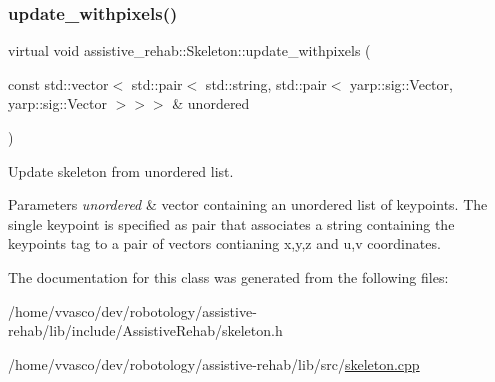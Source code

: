 \subsubsection{\texorpdfstring{update\+\_\+withpixels()}{update\_withpixels()}\hspace{0.1cm}{\footnotesize\ttfamily [2/2]}}
{\footnotesize\ttfamily virtual void assistive\+\_\+rehab\+::\+Skeleton\+::update\+\_\+withpixels (\begin{DoxyParamCaption}\item[{const std\+::vector$<$ std\+::pair$<$ std\+::string, std\+::pair$<$ yarp\+::sig\+::\+Vector, yarp\+::sig\+::\+Vector $>$$>$$>$ \&}]{unordered }\end{DoxyParamCaption})\hspace{0.3cm}{\ttfamily [virtual]}}



Update skeleton from unordered list. 


\begin{DoxyParams}{Parameters}
{\em unordered} & vector containing an unordered list of keypoints. The single keypoint is specified as pair that associates a string containing the keypoint\textquotesingle{}s tag to a pair of vectors contianing x,y,z and u,v coordinates. \\
\hline
\end{DoxyParams}


The documentation for this class was generated from the following files\+:\begin{DoxyCompactItemize}
\item 
/home/vvasco/dev/robotology/assistive-\/rehab/lib/include/\+Assistive\+Rehab/skeleton.\+h\item 
/home/vvasco/dev/robotology/assistive-\/rehab/lib/src/\hyperlink{skeleton_8cpp}{skeleton.\+cpp}\end{DoxyCompactItemize}
